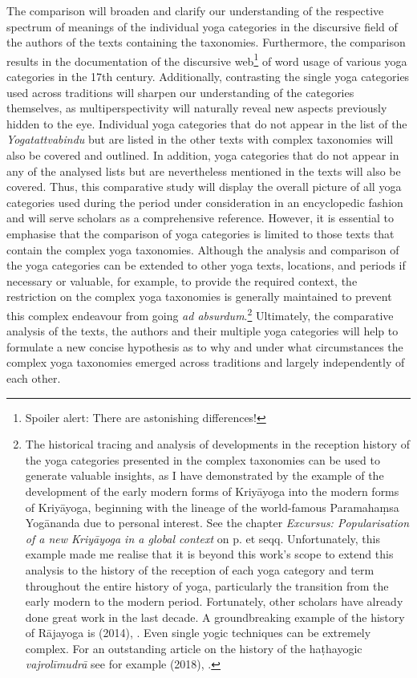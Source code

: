 The comparison will broaden and clarify our understanding of the respective spectrum of meanings of the individual yoga categories in the discursive field of the authors of the texts containing the taxonomies. Furthermore, the comparison results in the documentation of the discursive web\footnote{Spoiler alert: There are astonishing differences!} of word usage of various yoga categories in the 17th century. Additionally, contrasting the single yoga categories used across traditions will sharpen our understanding of the categories themselves, as multiperspectivity will naturally reveal new aspects previously hidden to the eye. Individual yoga categories that do not appear in the list of the \textit{Yogatattvabindu} but are listed in the other texts with complex taxonomies will also be covered and outlined. In addition, yoga categories that do not appear in any of the analysed lists but are nevertheless mentioned in the texts will also be covered. Thus, this comparative study will display the overall picture of all yoga categories used during the period under consideration in an encyclopedic fashion and will serve scholars as a comprehensive reference. However, it is essential to emphasise that the comparison of yoga categories is limited to those texts that contain the complex yoga taxonomies. Although the analysis and comparison of the yoga categories can be extended to other yoga texts, locations, and periods if necessary or valuable, for example, to provide the required context, the restriction on the complex yoga taxonomies is generally maintained to prevent this complex endeavour from going \textit{ad absurdum}.\footnote{The historical tracing and analysis of developments in the reception history of the yoga categories presented in the complex taxonomies can be used to generate valuable insights, as I have demonstrated by the example of the development of the early modern forms of Kriyāyoga into the modern forms of Kriyāyoga, beginning with the lineage of the world-famous Paramahaṃsa Yogānanda due to personal interest. See the chapter \textit{Excursus: Popularisation of a new Kriyāyoga in a global context} on p.\pageref{excursus} et seqq. Unfortunately, this example made me realise that it is beyond this work's scope to extend this analysis to the history of the reception of each yoga category and term throughout the entire history of yoga, particularly the transition from the early modern to the modern period. Fortunately, other scholars have already done great work in the last decade. A groundbreaking example of the history of Rājayoga is \citeauthor{birch2014} (2014), . Even single yogic techniques can be extremely complex. For an outstanding article on the history of the haṭhayogic \textit{vajrolīmudrā} see for example \citeauthor{mallinson2018vajrolimudra} (2018), .} Ultimately, the comparative analysis of the texts, the authors and their multiple yoga categories will help to formulate a new concise hypothesis as to why and under what circumstances the complex yoga taxonomies emerged across traditions and largely independently of each other.

